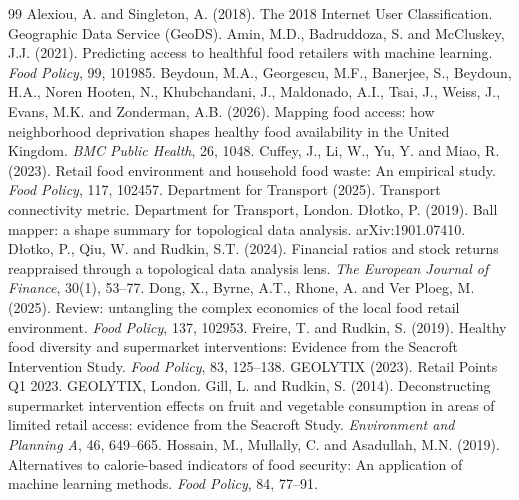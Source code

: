 \documentclass[11pt,a4paper]{article}
\begin{document}
\begin{thebibliography}{99}
 Alexiou, A. and Singleton, A. (2018). The 2018 Internet User Classification. Geographic Data Service (GeoDS).
 Amin, M.D., Badruddoza, S. and McCluskey, J.J. (2021). Predicting access to healthful food retailers with machine learning. \emph{Food Policy}, 99, 101985.
 Beydoun, M.A., Georgescu, M.F., Banerjee, S., Beydoun, H.A., Noren Hooten, N., Khubchandani, J., Maldonado, A.I., Tsai, J., Weiss, J., Evans, M.K. and Zonderman, A.B. (2026). Mapping food access: how neighborhood deprivation shapes healthy food availability in the United Kingdom. \emph{BMC Public Health}, 26, 1048.
 Cuffey, J., Li, W., Yu, Y. and Miao, R. (2023). Retail food environment and household food waste: An empirical study. \emph{Food Policy}, 117, 102457.
 Department for Transport (2025). Transport connectivity metric. Department for Transport, London.
 Dłotko, P. (2019). Ball mapper: a shape summary for topological data analysis. arXiv:1901.07410.
 Dłotko, P., Qiu, W. and Rudkin, S.T. (2024). Financial ratios and stock returns reappraised through a topological data analysis lens. \emph{The European Journal of Finance}, 30(1), 53--77.
 Dong, X., Byrne, A.T., Rhone, A. and Ver Ploeg, M. (2025). Review: untangling the complex economics of the local food retail environment. \emph{Food Policy}, 137, 102953.
 Freire, T. and Rudkin, S. (2019). Healthy food diversity and supermarket interventions: Evidence from the Seacroft Intervention Study. \emph{Food Policy}, 83, 125--138.
 GEOLYTIX (2023). Retail Points Q1 2023. GEOLYTIX, London.
 Gill, L. and Rudkin, S. (2014). Deconstructing supermarket intervention effects on fruit and vegetable consumption in areas of limited retail access: evidence from the Seacroft Study. \emph{Environment and Planning A}, 46, 649--665.
 Hossain, M., Mullally, C. and Asadullah, M.N. (2019). Alternatives to calorie-based indicators of food security: An application of machine learning methods. \emph{Food Policy}, 84, 77--91.

\end{thebibliography}
\end{document}

